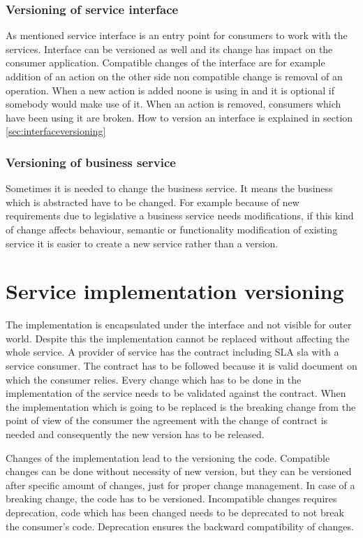 \subsubsection{\textbf{Versioning of service interface}}
As mentioned service interface is an entry point for consumers to work with the services. Interface can be versioned as well and its change has impact on the consumer application. Compatible changes of the interface are for example addition of an action on the other side non compatible change is removal of an operation. When a new action is added noone is using in and it is optional if somebody would make use of it. When an action is removed, consumers which have been using it are broken. How to version an interface is explained in section \ref{sec:interfaceversioning}

\subsubsection{\textbf{Versioning of business service}}
Sometimes it is needed to change the business service. It means the business which is abstracted have to be changed. For example because of new requirements due to legislative a business service needs modifications, if this kind of change affects behaviour, semantic or functionality modification of existing service it is easier to create a new service rather than a version. 

\section{Service implementation versioning}
\label{sec:implversioning}
The implementation is encapsulated under the interface and not visible for outer world. Despite this the implementation cannot be replaced without affecting the whole service. A provider of service has the contract including SLA \gls{sla} with a service consumer. The contract has to be followed because it is valid document on which the consumer relies. 
Every change which has to be done in the implementation of the service needs to be validated against the contract. When the implementation which is going to be replaced is the breaking change from the point of view of the consumer the agreement with the change of contract is needed and consequently the new version has to be released.


Changes of the implementation lead to the versioning the code. Compatible changes can be done without necessity of new version, but they can be versioned after specific amount of changes, just for proper change management. In case of a breaking change, the code has to be versioned. Incompatible changes requires deprecation, code which has been changed needs to be deprecated to not break the consumer's code. Deprecation ensures the backward compatibility of changes.

